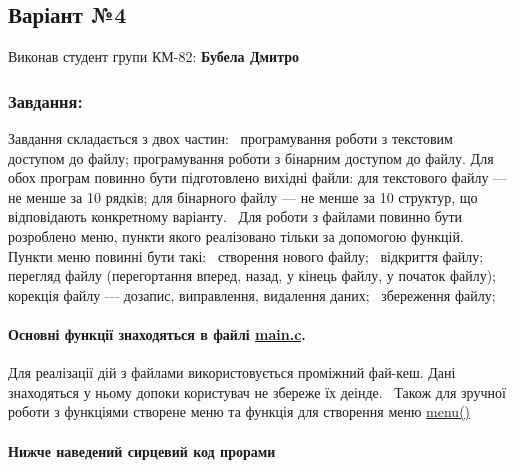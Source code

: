 \begin{center} \subsection*{Варіант №4}\end{center} 

\begin{center} \end{center}  Виконав студент групи КМ-\/82\+: {\bfseries Бубела Дмитро}~\newline
 \subsubsection*{Завдання\+:}

Завдання складається з двох частин\+:~\newline
програмування роботи з текстовим доступом до файлу; програмування роботи з бінарним доступом до файлу. Для обох програм повинно бути підготовлено вихідні файли\+: для текстового файлу — не менше за 10 рядків; для бінарного файлу — не менше за 10 структур, що відповідають конкретному варіанту.~\newline
Для роботи з файлами повинно бути розроблено меню, пункти якого реалізовано тільки за допомогою функцій. Пункти меню повинні бути такі\+:~\newline
створення нового файлу;~\newline
відкриття файлу;~\newline
перегляд файлу (перегортання вперед, назад, у кінець файлу, у початок файлу);~\newline
корекція файлу — дозапис, виправлення, видалення даних;~\newline
збереження файлу;~\newline
\paragraph*{Основні функції знаходяться в файлі \hyperlink{main_8c}{main.\+c}.}

Для реалізації дій з файлами використовується проміжний фай-\/кеш. Дані знаходяться у ньому допоки користувач не збереже їх деінде.~\newline
Також для зручної роботи з функціями створене меню та функція для створення меню \hyperlink{lab__functions_8h_a5f3f744789213f961f3c8ec1cc482af7}{menu()} \paragraph*{Нижче наведений сирцевий код прорами}


